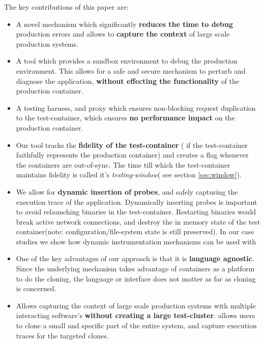 The key contributions of this paper are:

\begin{itemize}[leftmargin=*]
\item A novel mechanism which significantly \textbf{reduces the time to debug} production errors and allows to \textbf{capture the context} of large scale production systems.
\item A tool which provides a sandbox environment to debug the production environment. 
This allows for a safe and secure mechanism to perturb and diagnose the application, \textbf{without effecting the functionality} of the  production container.

\item A testing harness, and proxy which ensures non-blocking request duplication to the test-container, which ensures \textbf{no performance impact} on the production container. 

\item Our tool tracks the \textbf{fidelity of the test-container} ( if the test-container faithfully represents the production container) and creates a flag whenever the containers are out-of-sync. 
The time till which the test-container maintains fidelity is called it's \emph{testing-window}( see section \ref{sec:window}).

\item We allow for \textbf{dynamic insertion of probes}, and safely capturing the execution trace of the application. 
Dynamically inserting probes is important to avoid relaunching binaries in the test-container. 
Restarting binaries would break active network connections, and destroy the in memory state of the test container(note: configuration/file-system state is still preserved).
In our case studies we show how dynamic instrumentation mechanisms can be used with \parikshan

\item One of the key advantages of our approach is that it is \textbf{language agnostic}. 
Since the underlying mechanism takes advantage of containers as a platform to do the cloning, the language or interface does not matter as far as cloning is concerned. 

\item Allows capturing the context of large scale production systems with multiple interacting software's \textbf{without creating a large test-cluster}. \parikshan allows users to clone a small and specific part of the entire system, and capture execution traces for the targeted clones.

\end{itemize}

